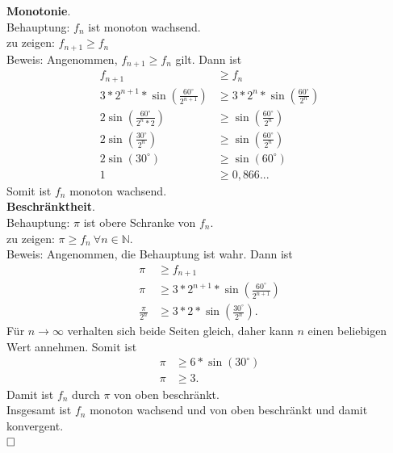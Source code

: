 \documentclass[12pt,a4paper]{article}
\newcommand{\qed}{\null\nobreak\hfill\square}
\begin{document}
\begin{enumerate}[(i)]
\begin{enumerate}[(a)]
        \textbf{Monotonie}.\\
        Behauptung: $f_n$ ist monoton wachsend.\\
        zu zeigen: $f_{n+1} \geq f_n$\\
        Beweis: Angenommen, $f_{n+1} \geq f_n$ gilt.
        Dann ist
        \begin{align*}
            f_{n+1} &\geq f_n\\
            3 * 2^{n+1} * \sin\left(\frac{60^{\circ}}{2^{n+1}}\right) &\geq 3 * 2^n * \sin\left(\frac{60^{\circ}}{2^n}\right)\\
            2\sin\left(\frac{60^{\circ}}{2^n*2}\right) &\geq \sin\left(\frac{60^{\circ}}{2^n}\right)\\
            2\sin\left(\frac{30^{\circ}}{2^n}\right) &\geq \sin\left(\frac{60^{\circ}}{2^n}\right)\\
            2\sin(30^{\circ}) &\geq \sin(60^{\circ})\\
            1 &\geq 0,866...
        \end{align*}
        Somit ist $f_n$ monoton wachsend.\\

        \textbf{Beschränktheit}.\\
        Behauptung: $\pi$ ist obere Schranke von $f_n$.\\
        zu zeigen: $\pi \geq f_n\ \forall n \in \mathbb{N}$.\\
        Beweis: Angenommen, die Behauptung ist wahr.
        Dann ist
        \begin{align*}
            \pi &\geq f_{n+1}\\
            \pi &\geq 3 * 2^{n+1} * \sin\left(\frac{60^{\circ}}{2^{n+1}}\right)\\
            \frac{\pi}{2^n} &\geq 3 * 2 * \sin\left(\frac{30^{\circ}}{2^n}\right).
        \end{align*}
        Für $n \to \infty$ verhalten sich beide Seiten gleich, daher kann $n$ einen beliebigen Wert annehmen.
        Somit ist
        \begin{align*}
            \pi &\geq 6 * \sin(30^{\circ})\\
            \pi &\geq 3.
        \end{align*}
        Damit ist $f_n$ durch $\pi$ von oben beschränkt.\\
        Insgesamt ist $f_n$ monoton wachsend und von oben beschränkt und damit konvergent.\\
        $\qed$
    \end{enumerate}
\end{enumerate}
\end{document}

